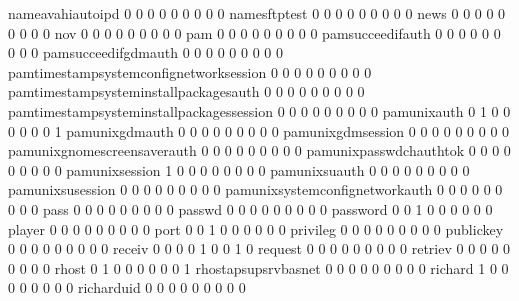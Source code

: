 \documentclass[compress,8pt]{beamer}
\begin{document}
\begin{frame}
\begin{Schunk}
  nameavahiautoipd                           0   0   0   0   0   0   0   0   0
  namesftptest                               0   0   0   0   0   0   0   0   0
  news                                       0   0   0   0   0   0   0   0   0
  nov                                        0   0   0   0   0   0   0   0   0
  pam                                        0   0   0   0   0   0   0   0   0
  pamsucceedifauth                           0   0   0   0   0   0   0   0   0
  pamsucceedifgdmauth                        0   0   0   0   0   0   0   0   0
  pamtimestampsystemconfignetworksession     0   0   0   0   0   0   0   0   0
  pamtimestampsysteminstallpackagesauth      0   0   0   0   0   0   0   0   0
  pamtimestampsysteminstallpackagessession   0   0   0   0   0   0   0   0   0
  pamunixauth                                0   1   0   0   0   0   0   0   1
  pamunixgdmauth                             0   0   0   0   0   0   0   0   0
  pamunixgdmsession                          0   0   0   0   0   0   0   0   0
  pamunixgnomescreensaverauth                0   0   0   0   0   0   0   0   0
  pamunixpasswdchauthtok                     0   0   0   0   0   0   0   0   0
  pamunixsession                             1   0   0   0   0   0   0   0   0
  pamunixsuauth                              0   0   0   0   0   0   0   0   0
  pamunixsusession                           0   0   0   0   0   0   0   0   0
  pamunixsystemconfignetworkauth             0   0   0   0   0   0   0   0   0
  pass                                       0   0   0   0   0   0   0   0   0
  passwd                                     0   0   0   0   0   0   0   0   0
  password                                   0   0   1   0   0   0   0   0   0
  player                                     0   0   0   0   0   0   0   0   0
  port                                       0   0   1   0   0   0   0   0   0
  privileg                                   0   0   0   0   0   0   0   0   0
  publickey                                  0   0   0   0   0   0   0   0   0
  receiv                                     0   0   0   0   1   0   0   1   0
  request                                    0   0   0   0   0   0   0   0   0
  retriev                                    0   0   0   0   0   0   0   0   0
  rhost                                      0   1   0   0   0   0   0   0   1
  rhostapsupsrvbasnet                        0   0   0   0   0   0   0   0   0
  richard                                    1   0   0   0   0   0   0   0   0
  richarduid                                 0   0   0   0   0   0   0   0   0

\end{Schunk}
\end{frame}
\end{document}
